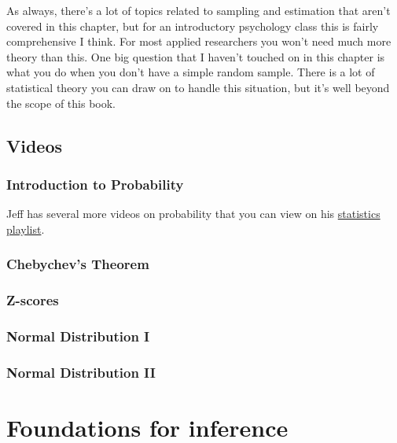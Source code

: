 \documentclass[
  letterpaper,
  DIV=11,
  numbers=noendperiod]{scrreprt}
\begin{document}
As always, there's a lot of topics related to sampling and estimation
that aren't covered in this chapter, but for an introductory psychology
class this is fairly comprehensive I think. For most applied researchers
you won't need much more theory than this. One big question that I
haven't touched on in this chapter is what you do when you don't have a
simple random sample. There is a lot of statistical theory you can draw
on to handle this situation, but it's well beyond the scope of this
book.

\section{Videos}\label{videos-2}

\subsection{Introduction to
Probability}\label{introduction-to-probability}

Jeff has several more videos on probability that you can view on his
\href{https://www.youtube.com/playlist?list=PLKXdxQAT3tCvuex_E1ZnQYaw897ELUSaI}{statistics
playlist}.

\subsection{Chebychev's Theorem}\label{chebychevs-theorem}

\subsection{Z-scores}\label{z-scores-1}

\subsection{Normal Distribution I}\label{normal-distribution-i}

\subsection{Normal Distribution II}\label{normal-distribution-ii}


\chapter{Foundations for inference}\label{foundations-for-inference}
\end{document}
